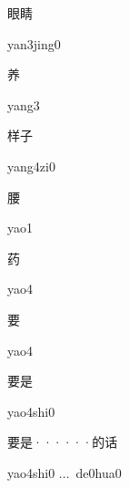 \begin{multicols*}{2}
\begin{verbete}{眼睛}
\begin{pronuncia}{yan3jing0}
\end{pronuncia}
\end{verbete}

\begin{verbete}[yang3]{养}
\begin{pronuncia}{yang3}
\end{pronuncia}
\end{verbete}

\begin{verbete}[yang4zi0]{样子}
\begin{pronuncia}{yang4zi0}
\end{pronuncia}
\end{verbete}

\begin{verbete}[yao1]{腰}
\begin{pronuncia}{yao1}
\end{pronuncia}
\end{verbete}

\begin{verbete}[yao4]{药}
\begin{pronuncia}{yao4}
\end{pronuncia}
\end{verbete}

\begin{verbete}[yao4]{要}
\begin{pronuncia}{yao4}
\end{pronuncia}
\end{verbete}

\begin{verbete}{要是}
\begin{pronuncia}{yao4shi0}
\end{pronuncia}
\end{verbete}

\begin{verbete}{要是······的话}
\begin{pronuncia}[\\]{yao4shi0 ...\  de0hua0}
\end{pronuncia}
\end{verbete}


\end{multicols*}
